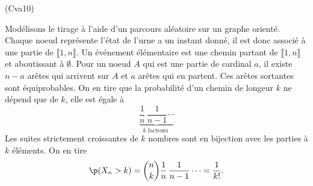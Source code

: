 \begin{tiny}(Cva10)\end{tiny} Modélisons le tirage à l'aide d'un parcours aléatoire sur un graphe orienté. Chaque noeud représente l'état de l'urne a un instant donné, il est donc associé à une partie de $\llbracket 1,n \rrbracket$.\newline
Un événement élémentaire est une chemin partant de $\llbracket 1,n \rrbracket$ et aboutissant à $\emptyset$.\newline
Pour un noeud $A$ qui est une partie de cardinal $a$, il existe $n-a$ arêtes qui arrivent sur $A$ et $a$ arêtes qui en partent. Ces arêtes sortantes sont équiprobables. On en tire que la probabilité d'un chemin de longeur $k$ ne dépend que de $k$, elle est égale à
\begin{displaymath}
 \underset{k \text{ facteurs }}{\underbrace{\frac{1}{n}\,\frac{1}{n-1}\cdots}}
\end{displaymath}
Les suites strictement croissantes de $k$ nombres sont en bijection avec les parties à $k$ éléments. On en tire
\begin{displaymath}
 \p(X_n>k) = \binom{n}{k}\frac{1}{n}\,\frac{1}{n-1}\cdots = \frac{1}{k!}.
\end{displaymath}
